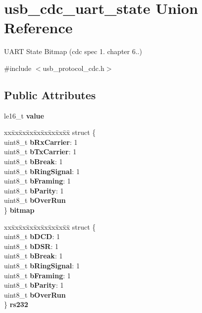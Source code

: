 \hypertarget{unionusb__cdc__uart__state}{}\section{usb\+\_\+cdc\+\_\+uart\+\_\+state Union Reference}
\label{unionusb__cdc__uart__state}


U\+A\+RT State Bitmap (cdc spec 1. chapter 6..)  




{\ttfamily \#include $<$usb\+\_\+protocol\+\_\+cdc.\+h$>$}

\subsection*{Public Attributes}
\begin{DoxyCompactItemize}
\item 
\mbox{\label{unionusb__cdc__uart__state_a8a5c914e058680f7d0cbcd026cbe364f}} 
le16\+\_\+t {\bfseries value}
\item 
\mbox{\label{unionusb__cdc__uart__state_af09a8a8111d7fe8a364212faa0f70016}} 
\begin{tabbing}
xx\=xx\=xx\=xx\=xx\=xx\=xx\=xx\=xx\=\kill
struct \{\\
\>uint8\_t {\bfseries bRxCarrier}: 1\\
\>uint8\_t {\bfseries bTxCarrier}: 1\\
\>uint8\_t {\bfseries bBreak}: 1\\
\>uint8\_t {\bfseries bRingSignal}: 1\\
\>uint8\_t {\bfseries bFraming}: 1\\
\>uint8\_t {\bfseries bParity}: 1\\
\>uint8\_t {\bfseries bOverRun}\\
\} {\bfseries bitmap}\\

\end{tabbing}\item 
\mbox{\label{unionusb__cdc__uart__state_a1f5a7908c1ce4c87af997e4b7f5542ac}} 
\begin{tabbing}
xx\=xx\=xx\=xx\=xx\=xx\=xx\=xx\=xx\=\kill
struct \{\\
\>uint8\_t {\bfseries bDCD}: 1\\
\>uint8\_t {\bfseries bDSR}: 1\\
\>uint8\_t {\bfseries bBreak}: 1\\
\>uint8\_t {\bfseries bRingSignal}: 1\\
\>uint8\_t {\bfseries bFraming}: 1\\
\>uint8\_t {\bfseries bParity}: 1\\
\>uint8\_t {\bfseries bOverRun}\\
\} {\bfseries rs232}\\


\end{tabbing}
\end{DoxyCompactItemize}
